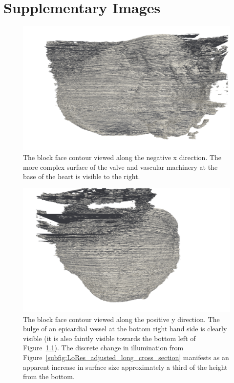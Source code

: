 \chapter{Supplementary Images} %
\label{cha:supplementary_images}
  \begin{figure}
    \centering
    \includegraphics[width=\textheight]{Ch5/Figs/Rat28/contours/LoRes_negative_x}
    \caption{The block face contour viewed along the negative x direction. The more complex surface of the valve and vascular machinery at the base of the heart is visible to the right.}
    \label{fig:LoRes_negative_x}
  \end{figure}
    
  \begin{figure}
    \centering
    \includegraphics[width=\textheight]{Ch5/Figs/Rat28/contours/LoRes_positive_y}
    \caption{The block face contour viewed along the positive y direction. The bulge of an epicardial vessel at the bottom right hand side is clearly visible (it is also faintly visible towards the bottom left of Figure~\ref{fig:LoRes_negative_x}). The discrete change in illumination from Figure~\ref{subfig:LoRes_adjusted_long_cross_section} manifests as an apparent increase in surface size approximately a third of the height from the bottom.}
    \label{fig:LoRes_positive_y}
  \end{figure}
    
